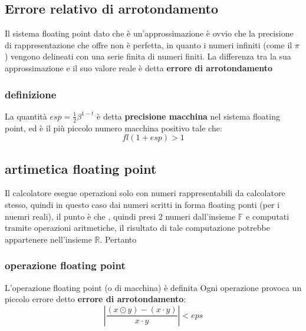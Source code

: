 \subsection{Errore relativo di arrotondamento}
Il sistema floating point dato che è un'approssimazione è ovvio che la precisione di rappresentazione che offre non è perfetta, in quanto i numeri infiniti (come il $\pi$) vengono delineati con una serie finita di numeri finiti. La differenza tra la sua approssimazione e il suo valore reale è detta \textbf{errore di arrotondamento}  
\subsubsection{definizione}
 La quantità $esp=\frac{1}{2}\beta^{1-t}$ è detta  \textbf{precisione macchina} nel sistema floating point, ed è il più piccolo numero macchina positivo tale che: 
 \[
    fl(1+esp)>1
 \]

\subsection{artimetica floating point}
Il calcolatore esegue operazioni solo con numeri rappresentabili da calcolatore stesso, quindi in questo caso dai numeri scritti in forma floating ponti (per i nuemri reali), il punto è che , quindi presi 2 numeri dall'insieme $\mathbb{F}$ e computati tramite operazioni aritmetiche, il risultato di tale computazione potrebbe appartenere nell'insieme $\mathbb{R}$. Pertanto 
\subsubsection{operazione floating point} 
L'operazione floating point (o di macchina) è definita
Ogni operazione provoca un piccolo errore detto \textbf{errore di arrotondamento}:
\[
    |\frac{(x\odot y)-(x\cdot y)}{x\cdot y}|<eps
\]

